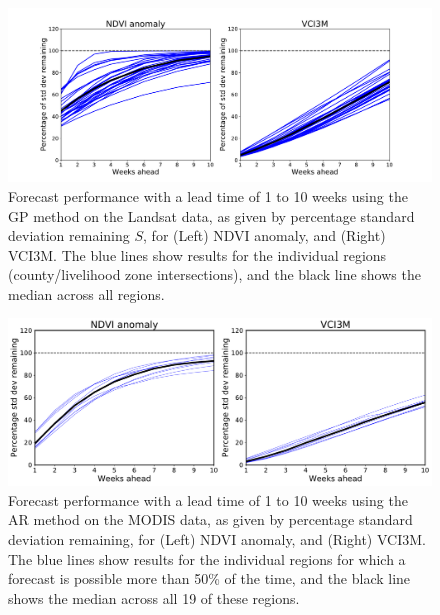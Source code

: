 \documentclass[review]{elsarticle}
\begin{document}
\begin{figure}[H]
	\centering
	\includegraphics[trim = 50mm 0mm 0mm 0mm,width=14 cm]{figures/FC-pref.pdf} 
	\caption{Forecast performance with a lead time of 1 to 10 weeks using the GP method on the Landsat data, as given by percentage standard deviation remaining $S$, for (Left) NDVI anomaly, and (Right) VCI3M. The blue lines show results for the individual regions (county/livelihood zone intersections), and the black line shows the median across all regions.} \label{fig:GP_NDVI_forecast}
\end{figure}

\begin{figure}[H]
	\centering
	\includegraphics[trim = 20mm 0mm 0mm 0mm,width=12.5cm]{figures/NDVI_forecast2.pdf} 
	\caption{Forecast performance with a lead time of 1 to 10 weeks using the AR method on the MODIS data, as given by percentage standard deviation remaining, for (Left) NDVI anomaly, and (Right) VCI3M. The blue lines show results for the individual regions for which a forecast is possible more than 50\% of the time, and the black line shows the median across all 19 of these regions.} \label{fig:NDVI_forecast}
\end{figure}
\end{document}
